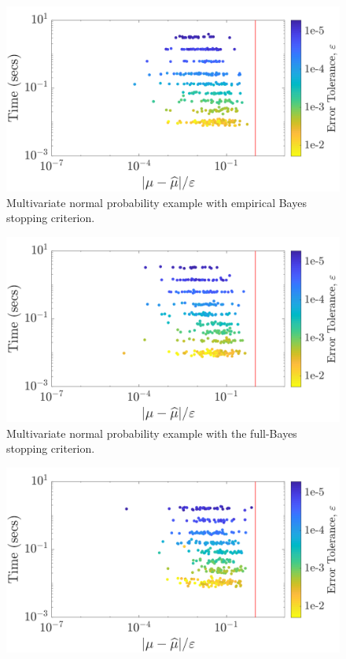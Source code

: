 \documentclass[graybox,footinfo]{svmult}
\begin{document}
{{{{{{\begin{figure}
\centering
\includegraphics[width=0.95\linewidth]{"figures/Sobol/Sobol_MVN_guaranteed_time_MLE__d2_r1_2019-Sep-1"}
\caption[Sobol: MVN guaranteed: MLE]{Multivariate normal probability example with empirical Bayes stopping criterion.}
\label{fig:Sobol-mvn-guaranteed-MLE}
\end{figure}
\begin{figure}
\centering
\includegraphics[width=0.95\linewidth]{"figures/Sobol/Sobol_MVN_guaranteed_time_full__d2_r1_2019-Sep-1"}
\caption[Sobol: MVN guaranteed: Full Bayes]{Multivariate normal probability example with the full-Bayes stopping criterion.}
\label{fig:Sobol-mvn-guaranteed-FB}
\end{figure}
\begin{figure}
\centering
\includegraphics[width=0.95\linewidth]{"figures/Sobol/Sobol_MVN_guaranteed_time_GCV__d2_r1_2019-Sep-1"}

\end{figure}}}}}}}
\end{document}
